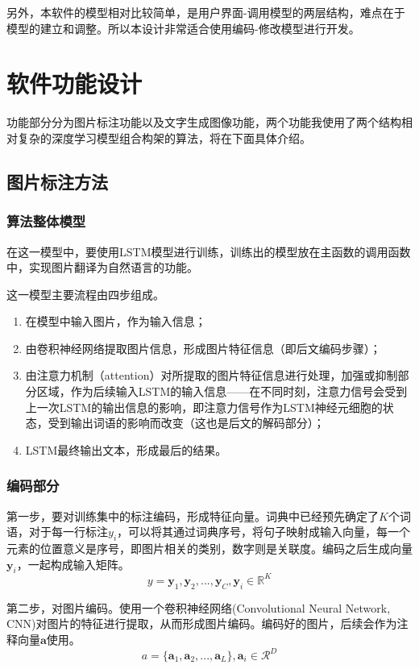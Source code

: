另外，本软件的模型相对比较简单，是用户界面-调用模型的两层结构，难点在于模型的建立和调整。所以本设计非常适合使用编码-修改模型进行开发。

\section{软件功能设计}
功能部分分为图片标注功能以及文字生成图像功能，两个功能我使用了两个结构相对复杂的深度学习模型组合构架的算法，将在下面具体介绍。
 
\subsection{图片标注方法}
\subsubsection{算法整体模型}
在这一模型中，要使用LSTM模型进行训练，训练出的模型放在主函数的调用函数中，实现图片翻译为自然语言的功能。

这一模型主要流程由四步组成。

\begin{enumerate}[fullwidth,itemindent=2em,label=\arabic*.]
    \item 在模型中输入图片，作为输入信息；
    \item 由卷积神经网络提取图片信息，形成图片特征信息（即后文编码步骤）；
    \item 由注意力机制（attention）对所提取的图片特征信息进行处理，加强或抑制部分区域，作为后续输入LSTM的输入信息——在不同时刻，注意力信号会受到上一次LSTM的输出信息的影响，即注意力信号作为LSTM神经元细胞的状态，受到输出词语的影响而改变（这也是后文的解码部分）；
    \item LSTM最终输出文本，形成最后的结果。
\end{enumerate}

\subsubsection{编码部分}
第一步，要对训练集中的标注编码，形成特征向量。词典中已经预先确定了$K$个词语，对于每一行标注$y_i$，可以将其通过词典序号，将句子映射成输入向量，每一个元素的位置意义是序号，即图片相关的类别，数字则是关联度。编码之后生成向量$\textbf{y}_i$，一起构成输入矩阵。
$$y = {\textbf{y}_1, \textbf{y}_2, ..., \textbf{y}_C}, \textbf{y}_i\in \mathbb{R}^K$$

第二步，对图片编码。使用一个卷积神经网络(Convolutional Neural Network, CNN)对图片的特征进行提取，从而形成图片编码。编码好的图片，后续会作为注释向量$\textbf{a}$使用。
$$a = \{\textbf{a}_1, \textbf{a}_2, ... , \textbf{a}_L\}, \textbf{a}_i \in \mathcal{R}^D$$

